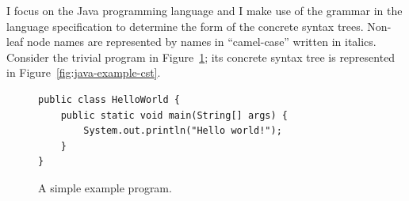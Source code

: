 I focus on the Java programming language and I make use of the grammar in the language specification \cite[][Chapter 18]{2012:book:gosling} to determine the form of the concrete syntax trees.  Non-leaf node names are represented by names in ``camel-case'' written in italics.  Consider the trivial program in Figure~\ref{fig:java-example}; its concrete syntax tree is represented in Figure~\ref{fig:java-example-cst}.

\begin{figure}
\begin{lstlisting}
public class HelloWorld {
    public static void main(String[] args) {
        System.out.println("Hello world!");
    }
}
\end{lstlisting}
\caption{A simple example \protect{} program.\label{fig:java-example}}
\end{figure}

